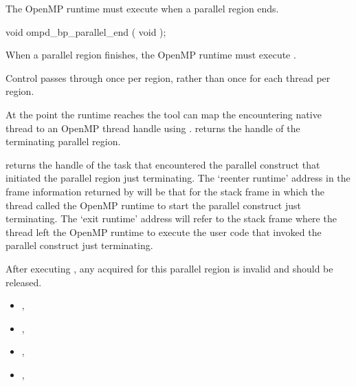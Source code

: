 The OpenMP runtime must execute 
when a parallel region ends.

\format
\begin{cspecific}
\begin{ompSyntax}
void ompd_bp_parallel_end ( void );
\end{ompSyntax}
\end{cspecific}


\descr

When a parallel region finishes, the OpenMP runtime must 
execute .

Control passes through 
once per region, rather than once for each thread per region.

At the point the runtime reaches 
the tool can map the encountering native thread
to an OpenMP thread handle using .
returns the handle of the terminating parallel region.

returns the handle of the task that encountered the
parallel construct that initiated the parallel region just
terminating.
The `reenter runtime' address in the frame information returned by
will be that for the stack frame in which the thread called the
OpenMP runtime to start the parallel construct just terminating.
The `exit runtime' address will refer to the stack frame where the
thread left the OpenMP runtime to execute the user code that
invoked the parallel construct just terminating.

After 
executing , any  acquired for this
parallel region is invalid and should be released.


\crossreferences
\begin{itemize}
\item
  , 
\item
  , 
\item
  , 
\item
  , 
\end{itemize}






